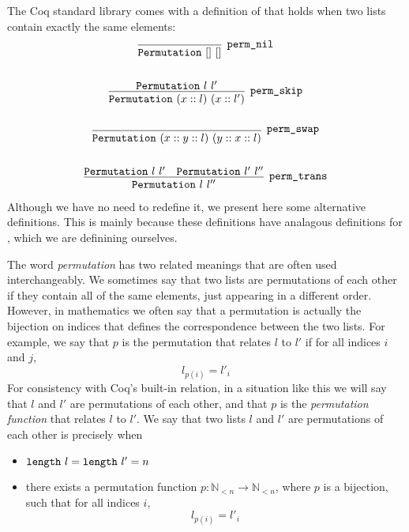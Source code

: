\documentclass[sigplan,10pt,anonymous,review]{thesis}
\begin{document}
The Coq standard library comes with a definition of 
that holds when two lists contain exactly the same elements:
\begin{gather*}
  \infer[\var{perm\_nil}]{\var{Permutation}~[]~[]}{}
  \\
  \\
  \infer[\var{perm\_skip}]{\var{Permutation}~(x :: l)~(x :: l')}{%
    \var{Permutation}~l~l'
  }
  \\
  \\
  \infer[\var{perm\_swap}]{\var{Permutation}~(x :: y :: l)~(y :: x :: l)}{}
  \\
  \\
  \infer[\var{perm\_trans}]{\var{Permutation}~l~l''}{
    \var{Permutation}~l~l' & \var{Permutation}~l'~l''
  }
\end{gather*}
Although we have no need to redefine it, we present here some
alternative definitions. This is mainly because these definitions have
analagous definitions for , which we are definining
ourselves.

The word \textit{permutation} has two related meanings that are often
used interchangeably. We sometimes say that two lists are permutations of each
other if they contain all of the same elements, just appearing in a
different order. However, in mathematics we often say that a
permutation is actually the bijection on indices that defines the
correspondence between the two lists. For example, we say that $p$ is
the permutation that relates $l$ to $l'$ if for all indices $i$ and
$j$,
\begin{equation*}
  l_{p(i)} = l'_i
\end{equation*}
For consistency with Coq's built-in  relation, in a
situation like this we will say that $l$ and $l'$ are permutations of
each other, and that $p$ is the \textit{permutation function} that
relates $l$ to $l'$. We say that two lists $l$ and $l'$ are
permutations of each other is precisely when
\begin{itemize}
  \item $\texttt{\textup{length}}~l = \texttt{\textup{length}}~l' = n$
  \item there exists a permutation function $p : \mathbb{N}_{<n} \to
    \mathbb{N}_{<n}$, where $p$ is a bijection, such that for all indices $i$,
    \begin{equation*}
      l_{p(i)} = l'_i
    \end{equation*}
\end{itemize}
\end{document}
